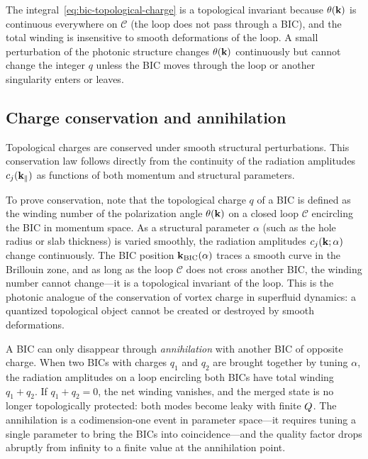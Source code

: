 \begin{booknote}
The integral~\eqref{eq:bic-topological-charge} is a topological invariant
because $\theta(\mathbf{k})$ is continuous everywhere on $\mathcal{C}$ (the
loop does not pass through a BIC), and the total winding is insensitive
to smooth deformations of the loop. A small perturbation of the
photonic structure changes $\theta(\mathbf{k})$ continuously but cannot change
the integer $q$ unless the BIC moves through the loop or another
singularity enters or leaves.
\end{booknote}

\subsection{Charge conservation and annihilation}
\label{ssec:charge-conservation}

Topological charges are conserved under smooth structural perturbations.
This conservation law follows directly from the continuity of the
radiation amplitudes $c_j(\mathbf{k}_\parallel)$ as functions of both
momentum and structural parameters.

To prove conservation, note that the topological charge $q$ of a BIC is
defined as the winding number of the polarization angle $\theta(\mathbf{k})$
on a closed loop $\mathcal{C}$ encircling the BIC in momentum space.
As a structural parameter $\alpha$ (such as the hole radius or slab
thickness) is varied smoothly, the radiation amplitudes
$c_j(\mathbf{k}; \alpha)$ change continuously. The BIC position
$\mathbf{k}_{\mathrm{BIC}}(\alpha)$ traces a smooth curve in the Brillouin
zone, and as long as the loop $\mathcal{C}$ does not cross another BIC,
the winding number cannot change---it is a topological invariant of the
loop. This is the photonic analogue of the conservation of vortex
charge in superfluid dynamics: a quantized topological object cannot be
created or destroyed by smooth deformations.

A BIC can only disappear through \emph{annihilation} with another BIC
of opposite charge. When two BICs with charges $q_1$ and $q_2$ are
brought together by tuning $\alpha$, the radiation amplitudes on a loop
encircling both BICs have total winding $q_1 + q_2$. If
$q_1 + q_2 = 0$, the net winding vanishes, and the merged state is no
longer topologically protected: both modes become leaky with finite
$Q$. The annihilation is a codimension-one event in parameter
space---it requires tuning a single parameter to bring the BICs into
coincidence---and the quality factor drops abruptly from infinity to a
finite value at the annihilation point.

